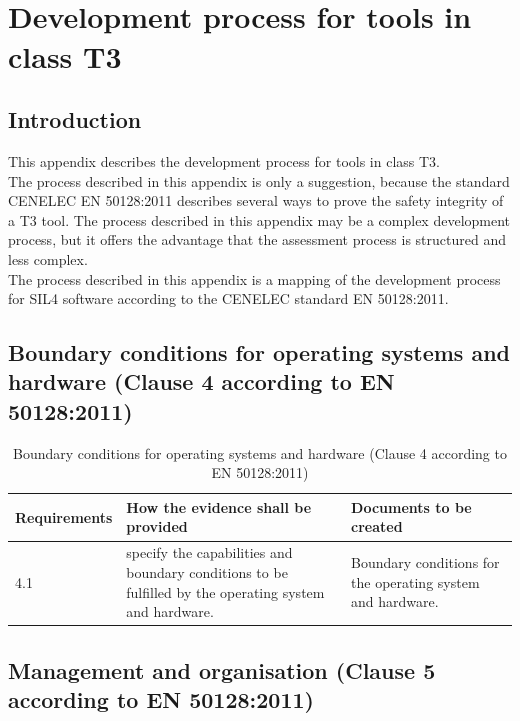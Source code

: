 \documentclass{template/openetcs_report}
\begin{document}
\chapter{\\Development process for tools in class T3}
\label{annexB}

\section{Introduction}
This appendix describes the development process for tools in class T3.\\
The process described in this appendix is only a suggestion, because the standard CENELEC EN 50128:2011 describes several ways to prove the safety integrity of a T3 tool. The process described in this appendix may be a complex development process, but it offers the advantage that the assessment process is structured and less complex.\\
The process described in this appendix is a mapping of the development process for SIL4 software according to the CENELEC standard EN 50128:2011.



\section{Boundary conditions for operating systems and hardware (Clause 4 according to EN 50128:2011)}
{\footnotesize\sffamily\centering
\begin{longtable}{|p{2cm}|p{9cm}|p{3cm}|}
\caption{Boundary conditions for operating systems and hardware (Clause 4 according to EN 50128:2011)}\\
\hline
\bfseries Requirements & \bfseries How the evidence shall be provided & \bfseries Documents to be created\\
\hline
\hline
\endhead
\hline
\endfoot

4.1 & specify the capabilities and boundary conditions to be fulfilled by the operating system and hardware. 
& Boundary conditions for the operating system and hardware.\\ 
\hline
\end{longtable}}


\section{Management and organisation (Clause 5 according to EN 50128:2011)}
\label{clause5}
\end{document}
